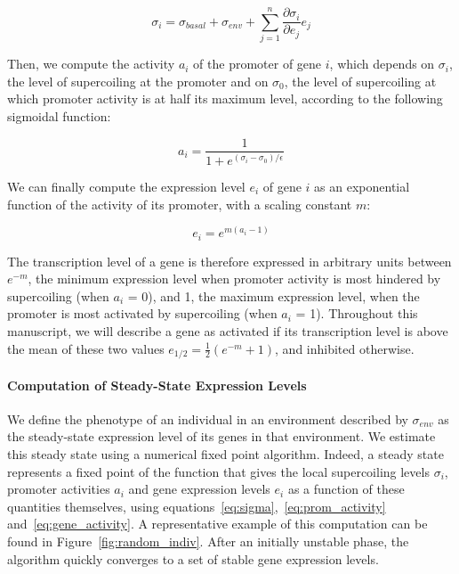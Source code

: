 \begin{equation}
  \sigma_i = \sigma_{basal} + \sigma_{env} + \sum_{j=1}^n\frac{\partial\sigma_{i}}{\partial e_j}e_j
  \label{eq:sigma}
\end{equation}

Then, we compute the activity $a_i$ of the promoter of gene $i$, which depends on $\sigma_i$, the level of supercoiling at the promoter and on $\sigma_0$, the level of supercoiling at which promoter activity is at half its maximum level, according to the following sigmoidal function:

\begin{equation}
  a_i = \frac{1}{1 + e^{(\sigma_i - \sigma_0)/\epsilon}}
  \label{eq:prom_activity}
\end{equation}

We can finally compute the expression level $e_i$ of gene $i$ as an exponential function of the activity of its promoter, with a scaling constant $m$:

\begin{equation}
  e_i = e^{m (a_i - 1)}
  \label{eq:gene_activity}
\end{equation}

The transcription level of a gene is therefore expressed in arbitrary units between $e^{-m}$, the minimum expression level when promoter activity is most hindered by supercoiling (when $a_i$ = 0), and 1, the maximum expression level, when the promoter is most activated by supercoiling (when $a_i$ = 1).
Throughout this manuscript, we will describe a gene as activated if its transcription level is above the mean of these two values $e_{1/2} = \frac{1}{2}(e^{-m} + 1)$, and inhibited otherwise.

\paragraph{Computation of Steady-State Expression Levels}

We define the phenotype of an individual in an environment described by $\sigma_{env}$ as the steady-state expression level of its genes in that environment.
We estimate this steady state using a numerical fixed point algorithm.
Indeed, a steady state represents a fixed point of the function that gives the local supercoiling levels $\sigma_i$, promoter activities $a_i$ and gene expression levels $e_i$ as a function of these quantities themselves, using equations~\ref{eq:sigma},~\ref{eq:prom_activity} and~\ref{eq:gene_activity}.
A representative example of this computation can be found in Figure~\ref{fig:random_indiv}.
After an initially unstable phase, the algorithm quickly converges to a set of stable gene expression levels.

